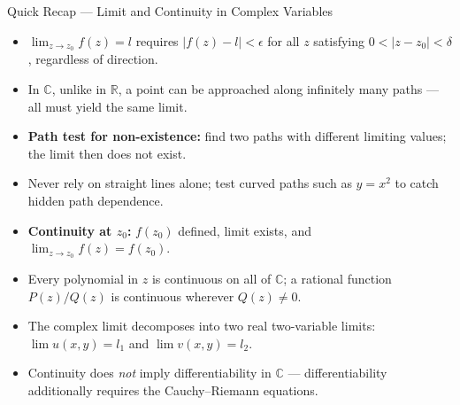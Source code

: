\documentclass[12pt,a4paper]{article}
\begin{document}
\begin{learnbox}{Quick Recap --- Limit and Continuity in Complex Variables}
\begin{itemize}[nosep]
  \item $\lim_{z \to z_0} f(z) = l$ requires $|f(z) - l| < \epsilon$ for
        all $z$ satisfying $0 < |z - z_0| < \delta$, regardless of direction.
  \item In $\mathbb{C}$, unlike in $\mathbb{R}$, a point can be approached
        along infinitely many paths --- all must yield the same limit.
  \item \textbf{Path test for non-existence:} find two paths with different
        limiting values; the limit then does not exist.
  \item Never rely on straight lines alone; test curved paths such as
        $y = x^2$ to catch hidden path dependence.
  \item \textbf{Continuity at $z_0$:} $f(z_0)$ defined, limit exists, and
        $\lim_{z \to z_0}f(z) = f(z_0)$.
  \item Every polynomial in $z$ is continuous on all of $\mathbb{C}$;
        a rational function $P(z)/Q(z)$ is continuous wherever $Q(z) \neq 0$.
  \item The complex limit decomposes into two real two-variable limits:
        $\lim u(x,y) = l_1$ and $\lim v(x,y) = l_2$.
  \item Continuity does \emph{not} imply differentiability in $\mathbb{C}$
        --- differentiability additionally requires the Cauchy--Riemann equations.
\end{itemize}
\end{learnbox}
\end{document}
